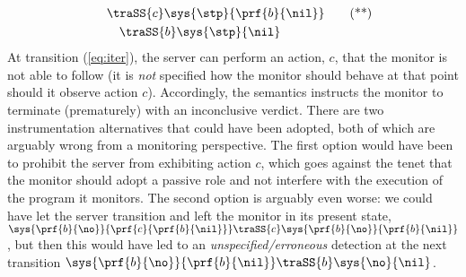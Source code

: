 \begin{example}
\begin{align*}
    & \quad\traSS{c}  \sys{\stp}{\prf{b}{\nil}}  \tag{**}\label{eq:iter} \\
    & \qquad\traSS{b} \sys{\stp}{\nil}
\end{align*}
   At transition (\ref{eq:iter}), the server can perform an action, $c$, that the monitor is not able to follow (\ie it is \emph{not} specified how the monitor should behave at that point should it observe action $c$).  Accordingly, the semantics instructs the monitor to terminate (prematurely) with an inconclusive verdict.   There are two instrumentation alternatives that could have been adopted, both of which are arguably wrong from a monitoring perspective.  The first option would have been to prohibit the server from exhibiting action $c$, which goes against the tenet that the monitor should adopt a passive role and not interfere with the execution of the program it monitors.  The second option is arguably even worse: we could have let the server transition and left the monitor in its present state, \ie    
   \begin{math}
     \sys{\prf{b}{\no}}{\prf{c}{\prf{b}{\nil}}} \traSS{c}  \sys{\prf{b}{\no}}{\prf{b}{\nil}}  
   \end{math}, 
   but then this would have led to an \emph{unspecified/erroneous} detection at the next transition 
   \begin{math}
     \sys{\prf{b}{\no}}{\prf{b}{\nil}}   \traSS{b}  \sys{\no}{\nil}  
   \end{math}.
    \exqed
\end{example}

